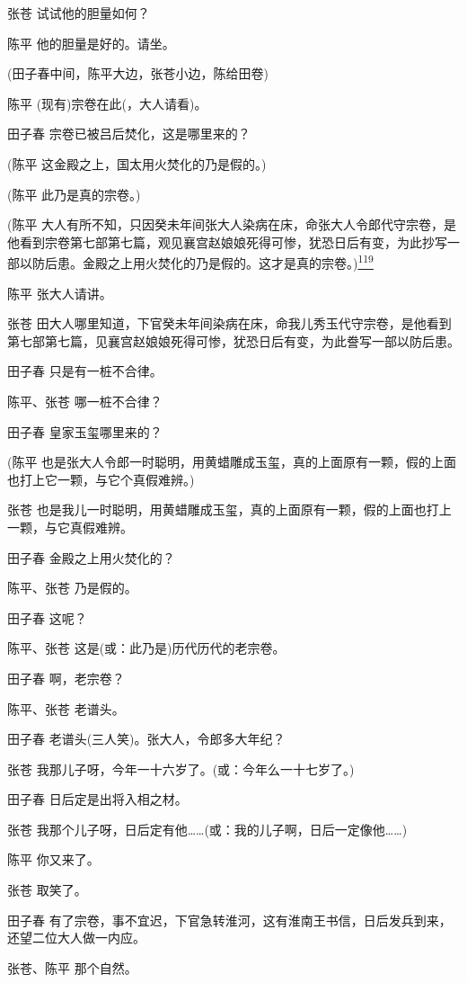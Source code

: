 张苍 试试他的胆量如何？

陈平 他的胆量是好的。请坐。

(田子春中间，陈平大边，张苍小边，陈给田卷)

陈平 (现有)宗卷在此(，大人请看)。

田子春 宗卷已被吕后焚化，这是哪里来的？

(陈平 这金殿之上，国太用火焚化的乃是假的。)

(陈平 此乃是真的宗卷。)

(陈平
大人有所不知，只因癸未年间张大人染病在床，命张大人令郎代守宗卷，是他看到宗卷第七部第七篇，观见襄宫赵娘娘死得可惨，犹恐日后有变，为此抄写一部以防后患。金殿之上用火焚化的乃是假的。这才是真的宗卷。)\protect\hyperlink{fn119}{\textsuperscript{119}}

陈平 张大人请讲。

张苍
田大人哪里知道，下官癸未年间染病在床，命我儿秀玉代守宗卷，是他看到第七部第七篇，见襄宫赵娘娘死得可惨，犹恐日后有变，为此誊写一部以防后患。

田子春 只是有一桩不合律。

陈平、张苍 哪一桩不合律？

田子春 皇家玉玺哪里来的？

(陈平
也是张大人令郎一时聪明，用黄蜡雕成玉玺，真的上面原有一颗，假的上面也打上它一颗，与它个真假难辨。)

张苍
也是我儿一时聪明，用黄蜡雕成玉玺，真的上面原有一颗，假的上面也打上一颗，与它真假难辨。

田子春 金殿之上用火焚化的？

陈平、张苍 乃是假的。

田子春 这呢？

陈平、张苍 这是(或：此乃是)历代历代的老宗卷。

田子春 啊，老宗卷？

陈平、张苍 老谱头。

田子春 老谱头(三人笑)。张大人，令郎多大年纪？

张苍 我那儿子呀，今年一十六岁了。(或：今年么一十七岁了。)

田子春 日后定是出将入相之材。

张苍
我那个儿子呀，日后定有他\ldots{}\ldots{}(或：我的儿子啊，日后一定像他\ldots{}\ldots{})

陈平 你又来了。

张苍 取笑了。

田子春
有了宗卷，事不宜迟，下官急转淮河，这有淮南王书信，日后发兵到来，还望二位大人做一内应。

张苍、陈平 那个自然。


